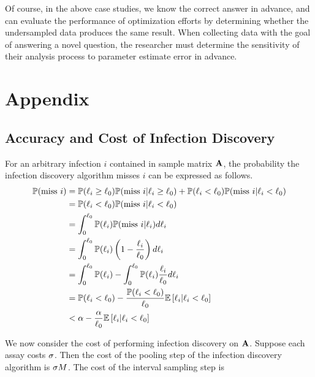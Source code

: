 \documentclass[11pt,notitlepage]{article}
\begin{document}
Of course, in the above case studies, we know the correct answer in advance, and can evaluate the performance of optimization efforts by determining whether the undersampled data produces the same result.
When collecting data with the goal of answering a novel question, the researcher must determine the sensitivity of their analysis process to parameter estimate error in advance.

\section{Appendix}

\subsection{Accuracy and Cost of Infection Discovery}\label{sec:infx-disc}
For an arbitrary infection $i$ contained in sample matrix $\mathbf{A}$, the probability the infection discovery algorithm misses $i$ can be expressed as follows.
\begin{equation*}
    \begin{split}
            \mathbb{P}(\text{miss }i) &= \mathbb{P}(\ell_i \geq \ell_0) \mathbb{P}(\text{miss }i | \ell_i \geq \ell_0) + \mathbb{P}(\ell_i < \ell_0) \mathbb{P}(\text{miss }i | \ell_i < \ell_0) \\
            &= \mathbb{P}(\ell_i < \ell_0) \mathbb{P}(\text{miss }i | \ell_i < \ell_0) \\
            &= \int_{0}^{\ell_0} \mathbb{P}(\ell_i) \mathbb{P}(\text{miss }i | \ell_i) d\ell_i \\
            &= \int_{0}^{\ell_0} \mathbb{P}(\ell_i) \left(1 - \frac{\ell_i}{\ell_0} \right) d\ell_i  \\
            &= \int_{0}^{\ell_0} \mathbb{P}(\ell_i) - \int_{0}^{\ell_0} \mathbb{P}(\ell_i)\frac{\ell_i}{\ell_0} d\ell_i  \\
            &= \mathbb{P}(\ell_i < \ell_0) - \frac{\mathbb{P}(\ell_i < \ell_0)}{\ell_0} \mathbb{E} \left[ \ell_i | \ell_i < \ell_0 \right] \\
            &< \alpha - \frac{\alpha}{\ell_0} \mathbb{E} \left[ \ell_i | \ell_i < \ell_0 \right]
    \end{split}
\end{equation*}

We now consider the cost of performing infection discovery on $\mathbf{A}$.
Suppose each assay costs $\sigma$.
Then the cost of the pooling step of the infection discovery algorithm is $\sigma M$.
The cost of the interval sampling step is 



\end{document}
